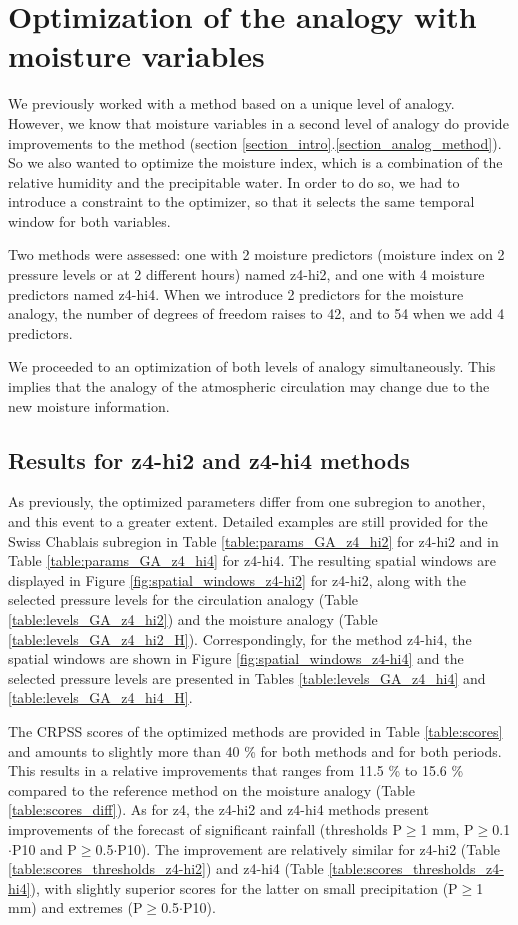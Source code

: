 \documentclass[twocol]{ametsoc}
\begin{document}
\section{Optimization of the analogy with moisture variables}

We previously worked with a method based on a unique level of analogy. However, we know that moisture variables in a second level of analogy do provide improvements to the method (section \ref{section_intro}.\ref{section_analog_method}). So we also wanted to optimize the moisture index, which is a combination of the relative humidity and the precipitable water. In order to do so, we had to introduce a constraint to the optimizer, so that it selects the same temporal window for both variables. 

Two methods were assessed: one with 2 moisture predictors (moisture index on 2 pressure levels or at 2 different hours) named z4-hi2, and one with 4 moisture predictors named z4-hi4. When we introduce 2 predictors for the moisture analogy, the number of degrees of freedom raises to 42, and to 54 when we add 4 predictors.

We proceeded to an optimization of both levels of analogy simultaneously. This implies that the analogy of the atmospheric circulation may change due to the new moisture information.


\subsection{Results for z4-hi2 and z4-hi4 methods}

As previously, the optimized parameters differ from one subregion to another, and this event to a greater extent. Detailed examples are still provided for the Swiss Chablais subregion in Table \ref{table:params_GA_z4_hi2} for z4-hi2 and in Table \ref{table:params_GA_z4_hi4} for z4-hi4. The resulting spatial windows are displayed in Figure \ref{fig:spatial_windows_z4-hi2} for z4-hi2, along with the selected pressure levels for the circulation analogy (Table \ref{table:levels_GA_z4_hi2}) and the moisture analogy (Table \ref{table:levels_GA_z4_hi2_H}). Correspondingly, for the method z4-hi4, the spatial windows are shown in Figure \ref{fig:spatial_windows_z4-hi4} and the selected pressure levels are presented in Tables \ref{table:levels_GA_z4_hi4} and \ref{table:levels_GA_z4_hi4_H}.

The CRPSS scores of the optimized methods are provided in Table \ref{table:scores} and amounts to slightly more than 40 \% for both methods and for both periods. This results in a relative improvements that ranges from 11.5 \% to 15.6 \% compared to the reference method on the moisture analogy (Table \ref{table:scores_diff}). As for z4, the z4-hi2 and z4-hi4 methods present improvements of the forecast of significant rainfall (thresholds P\(\geq\)1 mm, P\(\geq\)0.1\(\cdot\)P10 and P\(\geq\)0.5\(\cdot\)P10). The improvement are relatively similar for z4-hi2 (Table \ref{table:scores_thresholds_z4-hi2}) and z4-hi4 (Table \ref{table:scores_thresholds_z4-hi4}), with slightly superior scores for the latter on small precipitation (P\(\geq\)1 mm) and extremes (P\(\geq\)0.5\(\cdot\)P10).
\end{document}
